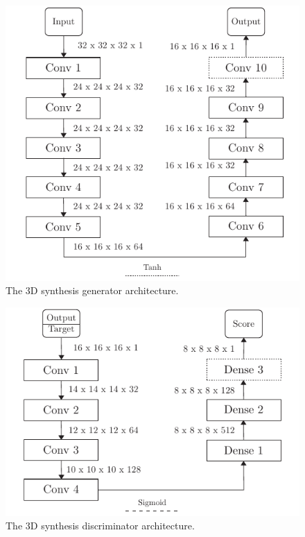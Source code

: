 \begin{figure}[h]
  \centering
  \includegraphics[width=\linewidth]{figure/synthesis-gen.pdf}
  \caption{The 3D synthesis generator architecture.
	}\label{fig:synthesis:gen}
\end{figure}
\begin{figure}[h]
  \centering
  \includegraphics[width=\linewidth]{figure/synthesis-disc.pdf}
  \caption{The 3D synthesis discriminator architecture.
	}\label{fig:synthesis:disc}
\end{figure}
